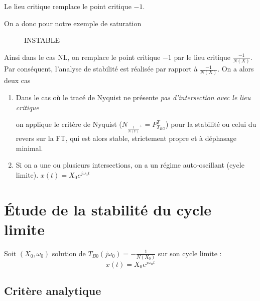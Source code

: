 \documentclass[main.tex]{subfiles}
\begin{document}
\begin{exemple}[saturation]
\begin{prop}
  Le lieu critique remplace le point critique $-1$.
\end{prop}
On a donc pour notre exemple de saturation

\begin{figure}[h!]
  \centering
  \caption{INSTABLE} 
\end{figure}

\end{exemple}

Ainsi dans le cas NL, on remplace le point critique $-1$ par le lieu critique $\frac{-1}{N(X)}$. Par conséquent, l'analyse de stabilité est réalisée par rapport à $\frac{-1}{N(X)}$.
On a alors deux cas
\begin{enumerate}
\item
  Dans le cas où le tracé de Nyquist ne présente \emph{pas d'intersection avec le lieu critique}

  on applique le critère de Nyquist ($ N_{\frac{1}{N(Y)}^{+}} = P^T_{T_{BO}}$) pour la stabilité ou celui du revers sur la FT, qui est alors stable, strictement propre et à déphasage minimal.

\item Si on a une ou plusieurs intersections, on a un régime auto-oscillant (cycle limite). $x(t) = X_0 e^{j\omega_0 t}$
\end{enumerate}
\section{Étude de la stabilité du cycle limite}

Soit $(X_0,\omega_0)$ solution de $T_{B0}(j\omega_0)=-\frac{1}{N(X_0)}$ sur son cycle limite :
\[
  x(t)= X_0e^{j\omega_0t}
\]

\subsection{Critère analytique}
\end{document}
